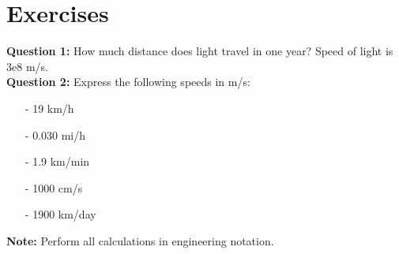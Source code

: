 \documentclass[12pt,a4paper]{article}
\begin{document}
\section{Exercises}
\noindent\textbf{Question 1:} How much distance does light travel in one year? Speed of light is $3\mathrm{e}8$ m/s.\\
\noindent\textbf{Question 2:} Express the following speeds in m/s:\\
\begin{enumerate}
\item[-] 19 km/h
\item[-] 0.030 mi/h
\item[-] 1.9 km/min
\item[-] 1000 cm/s
\item[-] 1900 km/day
\end{enumerate}
\noindent\textbf{Note:} Perform all calculations in engineering notation.


\end{document}
